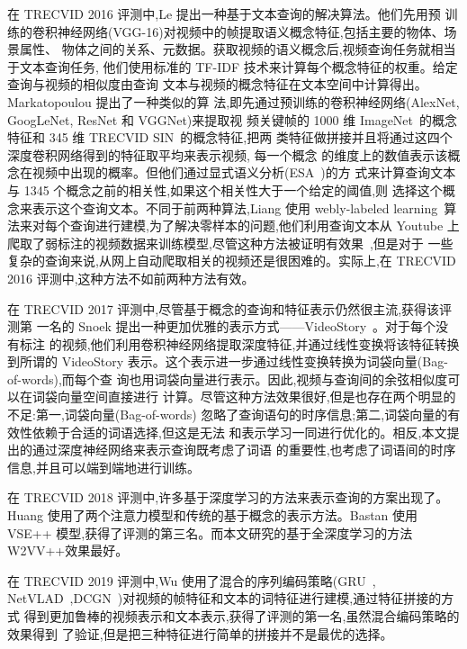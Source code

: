 在 TRECVID 2016 评测中,Le \etal\cite{le2016nii}提出一种基于文本查询的解决算法。他们先用预
训练的卷积神经网络(VGG-16)对视频中的帧提取语义概念特征,包括主要的物体、场景属性、
物体之间的关系、元数据。获取视频的语义概念后,视频查询任务就相当于文本查询任务,
他们使用标准的 TF-IDF 技术来计算每个概念特征的权重。给定查询与视频的相似度由查询
文本与视频的概念特征在文本空间中计算得出。Markatopoulou \etal\cite{foteini2016iti}提出了一种类似的算
法,即先通过预训练的卷积神经网络(AlexNet, GoogLeNet, ResNet 和 VGGNet)来提取视
频关键帧的 1000 维 ImageNet~\cite{}的概念特征和 345 维 TRECVID SIN~\cite{}的概念特征,把两
类特征做拼接并且将通过这四个深度卷积网络得到的特征取平均来表示视频, 每一个概念
的维度上的数值表示该概念在视频中出现的概率。但他们通过显式语义分析(ESA~\cite{})的方
式来计算查询文本与 1345 个概念之前的相关性,如果这个相关性大于一个给定的阈值,则
选择这个概念来表示这个查询文本。不同于前两种算法,Liang \etal\cite{}使用 webly-labeled
learning~\cite{}算法来对每个查询进行建模,为了解决零样本的问题,他们利用查询文本从
Youtube 上爬取了弱标注的视频数据来训练模型,尽管这种方法被证明有效果~\cite{},但是对于
一些复杂的查询来说,从网上自动爬取相关的视频还是很困难的。实际上,在 TRECVID 2016
评测中,这种方法不如前两种方法有效。

在 TRECVID 2017 评测中,尽管基于概念的查询和特征表示仍然很主流,获得该评测第
一名的 Snoek \etal\cite{}提出一种更加优雅的表示方式——VideoStory~\cite{}。对于每个没有标注
的视频,他们利用卷积神经网络提取深度特征,并通过线性变换将该特征转换到所谓的
VideoStory 表示。这个表示进一步通过线性变换转换为词袋向量(Bag-of-words),而每个查
询也用词袋向量进行表示。因此,视频与查询间的余弦相似度可以在词袋向量空间直接进行
计算。尽管这种方法效果很好,但是也存在两个明显的不足:第一,词袋向量(Bag-of-words)
忽略了查询语句的时序信息;第二,词袋向量的有效性依赖于合适的词语选择,但这是无法
和表示学习一同进行优化的。相反,本文提出的通过深度神经网络来表示查询既考虑了词语
的重要性,也考虑了词语间的时序信息,并且可以端到端地进行训练。

在 TRECVID 2018 评测中,许多基于深度学习的方法来表示查询的方案出现了。Huang \etal\cite{}使用了两个注意力模型和传统的基于概念的表示方法。Bastan \etal\cite{}使用 VSE++
模型,获得了评测的第三名。而本文研究的基于全深度学习的方法 W2VV++效果最好。

在 TRECVID 2019 评测中,Wu \etal\cite{}使用了混合的序列编码策略(GRU~\cite{},
NetVLAD~\cite{},DCGN~\cite{})对视频的帧特征和文本的词特征进行建模,通过特征拼接的方式
得到更加鲁棒的视频表示和文本表示,获得了评测的第一名,虽然混合编码策略的效果得到
了验证,但是把三种特征进行简单的拼接并不是最优的选择。

